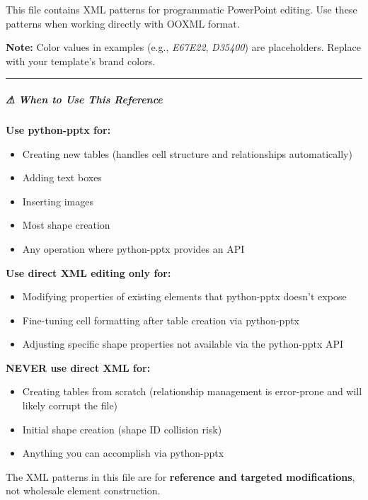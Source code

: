 \documentclass[11pt]{article}
\begin{document}
This file contains XML patterns for programmatic PowerPoint editing. Use these patterns when working directly with OOXML format.


\textbf{Note:} Color values in examples (e.g., \emph{E67E22}, \emph{D35400}) are placeholders. Replace with your template's brand colors.


\vspace{0.5em}\hrule\vspace{0.5em}

\subparagraph{⚠ When to Use This Reference}\mbox{}\par

\textbf{Use python-pptx for:}

\begin{itemize}[leftmargin=*,itemsep=2pt,topsep=2pt]
\item {} Creating new tables (handles cell structure and relationships automatically)
\item {} Adding text boxes
\item {} Inserting images
\item {} Most shape creation
\item {} Any operation where python-pptx provides an API
\end{itemize}

\textbf{Use direct XML editing only for:}

\begin{itemize}[leftmargin=*,itemsep=2pt,topsep=2pt]
\item {} Modifying properties of existing elements that python-pptx doesn't expose
\item {} Fine-tuning cell formatting after table creation via python-pptx
\item {} Adjusting specific shape properties not available via the python-pptx API
\end{itemize}

\textbf{NEVER use direct XML for:}

\begin{itemize}[leftmargin=*,itemsep=2pt,topsep=2pt]
\item {} Creating tables from scratch (relationship management is error-prone and will likely corrupt the file)
\item {} Initial shape creation (shape ID collision risk)
\item {} Anything you can accomplish via python-pptx
\end{itemize}

The XML patterns in this file are for \textbf{reference and targeted modifications}, not wholesale element construction.
\end{document}

